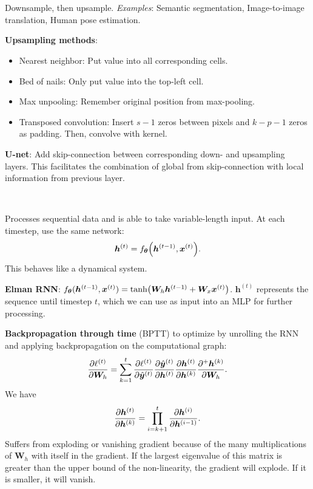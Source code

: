 \documentclass{article}
\newcommand{\lft}{\mathopen{}\mathclose\bgroup\left}
\newcommand{\rgt}{\aftergroup\egroup\right}
\renewcommand{\vec}[1]{\bm{#1}}
\newcommand{\mat}[1]{\bm{#1}}
\newenvironment{topic}[1]
{\textbf{\sffamily \colorbox{black}{\rlap{\textbf{\textcolor{white}{#1}}}\hspace{\linewidth}\hspace{-2\fboxsep}}} \\ \vspace{0.2cm}}
{}
\begin{document}
\begin{multicols*}{2}
\begin{topic}{Convolutional neural networks}
    \end{topic}

    \begin{topic}{Fully convolutional neural networks}
        Downsample, then upsample. \textit{Examples}: Semantic segmentation, Image-to-image translation, Human pose estimation.

        \textbf{Upsampling methods}:

        \begin{itemize}
            \item Nearest neighbor: Put value into all corresponding cells.
            \item Bed of nails: Only put value into the top-left cell.
            \item Max unpooling: Remember original position from max-pooling.
            \item Transposed convolution: Insert $s-1$ zeros between pixels and $k-p-1$ zeros as padding. Then,
                  convolve with kernel.
        \end{itemize}

        \textbf{U-net}: Add skip-connection between corresponding down- and upsampling layers. This facilitates the
        combination of global from skip-connection with local information from previous layer.

    \end{topic}

    \begin{topic}{Recurrent neural networks}

        Processes sequential data and is able to take variable-length input. At each timestep, use the same
        network: \[
            \vec{h}^{(t)} = f_{\vec{\theta}} \lft( \vec{h}^{(t-1)}, \vec{x}^{(t)} \rgt).
        \]
        This behaves like a dynamical system.

        \textbf{Elman RNN}: $f_{\vec{\theta}}(\vec{h}^{(t-1)}, \vec{x}^{(t)}) = \tanh \lft( \mat{W}_h \vec{h}^{(t-1)} + \mat{W}_x \vec{x}^{(t)} \rgt)$.
        $\vec{h}^{(t)}$ represents the sequence until timestep $t$, which we can use as input into an
        MLP for further processing.

        \textbf{Backpropagation through time} (BPTT) to optimize by unrolling the RNN and applying backpropagation
        on the computational graph: \[
            \pdv{\ell^{(t)}}{\mat{W}_h} = \sum_{k=1}^{t} \pdv{\ell^{(t)}}{\hat{\vec{y}}^{(t)}} \pdv{\hat{\vec{y}}^{(t)}}{\vec{h}^{(t)}} \pdv{\vec{h}^{(t)}}{\vec{h}^{(k)}} \pdv{^+ \vec{h}^{(k)}}{\mat{W}_h}.
        \]
        We have \[
            \pdv{\vec{h}^{(t)}}{\vec{h}^{(k)}} = \prod_{i=k+1}^t \pdv{\vec{h}^{(i)}}{\vec{h}^{(i-1)}}.
        \]
        Suffers from exploding or vanishing gradient because of the many multiplications of $\mat{W}_h$
        with itself in the gradient. If the largest eigenvalue of this matrix is greater than the upper
        bound of the non-linearity, the gradient will explode. If it is smaller, it will vanish.


\end{topic}
\end{multicols*}
\end{document}
